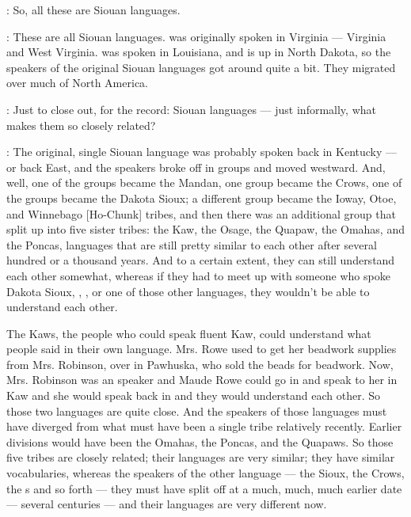 \documentclass[output=paper]{LSP/langsci}
\begin{document}
: So, all these are Siouan languages.

: These are all Siouan languages.  was originally spoken in Virginia --- Virginia and West Virginia.  was spoken in Louisiana, and  is up in North Dakota, so the speakers of the original Siouan languages got around quite a bit. They migrated over much of North America.

: Just to close out, for the record: Siouan languages --- just informally, what makes them so closely related?

: The original, single Siouan language was probably spoken back in Kentucky --- or back East, and the speakers broke off in groups and moved westward. And, well, one of the groups became the Mandan, one group became the Crows, one of the groups became the Dakota Sioux; a different group became the Ioway, Otoe, and Winnebago [Ho-Chunk] tribes, and then there was an additional group that split up into five sister tribes: the Kaw, the Osage, the Quapaw, the Omahas, and the Poncas, languages that are still pretty similar to each other after several hundred or a thousand years. And to a certain extent, they can still understand each other somewhat, whereas if they had to meet up with someone who spoke Dakota Sioux, , , or one of those other languages, they wouldn't be able to understand each other.

The Kaws, the people who could speak fluent Kaw, could understand what  people said in their own language. Mrs. Rowe used to get her beadwork supplies from Mrs. Robinson, over in Pawhuska, who sold the beads for beadwork. Now, Mrs. Robinson was an  speaker and Maude Rowe could go in and speak to her in Kaw and she would speak back in  and they would understand each other. So those two languages are quite close. And the speakers of those languages must have diverged from what must have been a single tribe relatively recently. Earlier divisions would have been the Omahas, the Poncas, and the Quapaws. So those five tribes are closely related; their languages are very similar; they have similar vocabularies, whereas the speakers of the other language --- the Sioux, the Crows, the s and so forth --- they must have split off at a much, much, much earlier date --- several centuries --- and their languages are very different now.
\end{document}
